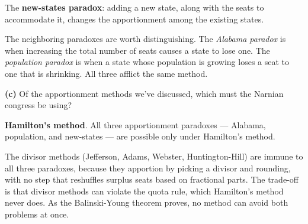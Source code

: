 \documentclass[12pt]{ximera}
\begin{document}
\begin{problem}
\begin{prompt}
\begin{feedback}
The \textbf{new-states paradox}: adding a new state, along with the seats to
accommodate it, changes the apportionment among the existing states.

The neighboring paradoxes are worth distinguishing. The \emph{Alabama paradox} is when
increasing the total number of seats causes a state to lose one. The \emph{population
paradox} is when a state whose population is growing loses a seat to one that is
shrinking. All three afflict the same method.
\end{feedback}
\end{prompt}

\begin{prompt}
\textbf{(c)} Of the apportionment methods we've discussed, which must the Narnian
congress be using?

\begin{multipleChoice}
\end{multipleChoice}

\begin{feedback}
\textbf{Hamilton's method}. All three apportionment paradoxes --- Alabama, population,
and new-states --- are possible only under Hamilton's method.

The divisor methods (Jefferson, Adams, Webster, Huntington-Hill) are immune to all
three paradoxes, because they apportion by picking a divisor and rounding, with no
step that reshuffles surplus seats based on fractional parts. The trade-off is that
divisor methods can violate the quota rule, which Hamilton's method never does. As the
Balinski-Young theorem proves, no method can avoid both problems at once.
\end{feedback}
\end{prompt}
\end{problem}
\end{document}
